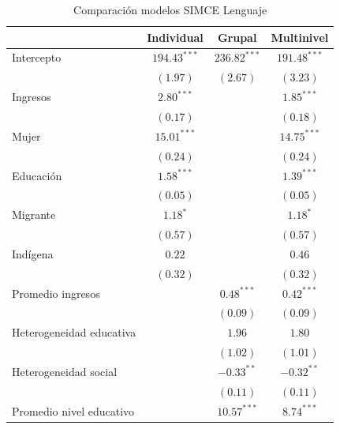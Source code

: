 \documentclass[
]{article}
\begin{document}
\begin{table}
\caption{Comparación modelos SIMCE Lenguaje}
\begin{center}
\begin{tabular}{l c c c}
\hline
 & Individual & Grupal & Multinivel \\
\hline
Intercepto                   & $194.43^{***}$ & $236.82^{***}$ & $191.48^{***}$ \\
                             & $(1.97)$       & $(2.67)$       & $(3.23)$       \\
Ingresos                     & $2.80^{***}$   &                & $1.85^{***}$   \\
                             & $(0.17)$       &                & $(0.18)$       \\
Mujer                        & $15.01^{***}$  &                & $14.75^{***}$  \\
                             & $(0.24)$       &                & $(0.24)$       \\
Educación                    & $1.58^{***}$   &                & $1.39^{***}$   \\
                             & $(0.05)$       &                & $(0.05)$       \\
Migrante                     & $1.18^{*}$     &                & $1.18^{*}$     \\
                             & $(0.57)$       &                & $(0.57)$       \\
Indígena                     & $0.22$         &                & $0.46$         \\
                             & $(0.32)$       &                & $(0.32)$       \\
Promedio ingresos            &                & $0.48^{***}$   & $0.42^{***}$   \\
                             &                & $(0.09)$       & $(0.09)$       \\
Heterogeneidad educativa     &                & $1.96$         & $1.80$         \\
                             &                & $(1.02)$       & $(1.01)$       \\
Heterogeneidad social        &                & $-0.33^{**}$   & $-0.32^{**}$   \\
                             &                & $(0.11)$       & $(0.11)$       \\
Promedio nivel educativo     &                & $10.57^{***}$  & $8.74^{***}$   \\

\end{tabular}
\end{center}
\end{table}
\end{document}
